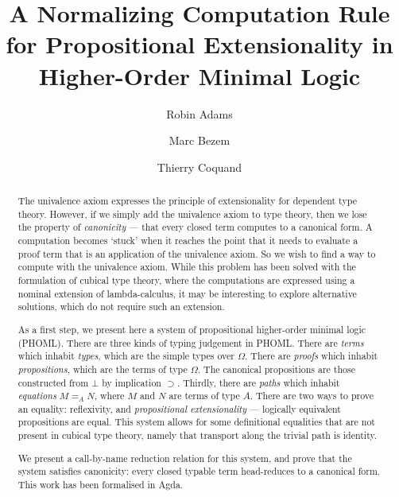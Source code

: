 \documentclass[a4paper,UKenglish]{lipics-v2016}
\title{A Normalizing Computation Rule for Propositional Extensionality in Higher-Order Minimal Logic
}
\author[1]{Robin Adams}
\author[1]{Marc Bezem}
\author[2]{Thierry Coquand}
\affil[1]{Universitetet i Bergen, Institutt for Informatikk, Postboks 7800, N-5020 BERGEN, Norway \\
  \texttt{\{robin.adams,bezem\}@ii.uib.no}}
\affil[2]{Chalmers tekniska högskola, Data- och informationsteknik, 412 96 Göteborg, Sweden \\
  \texttt{coquand@chalmers.se}}
\theoremstyle{plain}
\theoremstyle{definition}
\begin{document}
\maketitle

\begin{abstract}
The univalence axiom expresses the principle of extensionality for dependent type theory. However, if we simply add the univalence axiom to type theory, then we lose the property of \emph{canonicity} --- that every closed term computes to a canonical form. A computation becomes `stuck' when it reaches the point that it needs to evaluate a proof term that is an application of the univalence axiom. So we wish to find a way to compute with the univalence axiom. While this problem has been solved with the formulation of cubical type theory, where the computations are expressed using a nominal extension of lambda-calculus, it may be interesting to explore alternative solutions, which do not require such an extension.

As a first step, we present here a system of propositional higher-order minimal logic (PHOML).  There are three kinds of typing judgement in PHOML.  There are \emph{terms} which inhabit \emph{types}, which are the simple types over $\Omega$.  There are \emph{proofs} which inhabit \emph{propositions}, which are the terms of type $\Omega$.  The canonical propositions are those constructed from $\bot$ by implication $\supset$.  Thirdly, there are \emph{paths} which inhabit \emph{equations} $M =_A N$, where $M$ and $N$ are terms of type $A$.  There are two ways to prove an equality: reflexivity, and \emph{propositional extensionality} --- logically equivalent propositions are equal.  This system allows for some definitional equalities that are not present in cubical type theory, namely that transport along the trivial path is identity.

We present a call-by-name reduction relation for this system, and prove that the system satisfies canonicity: every closed typable term head-reduces to a canonical form.  This work has been formalised in Agda.
 \end{abstract}

\end{document}
